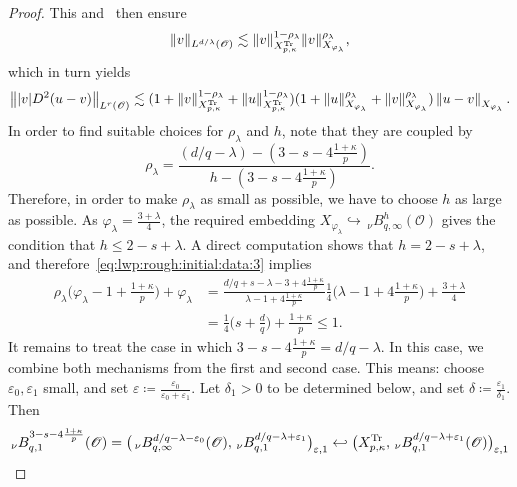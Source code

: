 \documentclass[reqno]{amsart}
\newcommand{\sO}{\mathscr{O}}
\newcommand{\ce}{\coloneqq}
\newcommand{\1}{\mathbf{1}}
\newcommand{\nrm}[1]{\left\lVert #1 \right\rVert}
\begin{document}
\begin{proof}
            This and~\cite[Theorem 1.3.3]{triebelInterpolationTheoryFunction1978} then ensure
            \begin{equation*}\| v\|_{L^{d/\lambda}(\sO)}\lesssim \|v\|_{X_{p,\kappa}^{\textup{Tr}}}^{1-\rho_\lambda} \|v\|_{X_{\varphi_\lambda}}^{\rho_\lambda},\end{equation*}
            which in turn yields
        	\[\nrm{|v|D^2(u-v)}_{L^r(\sO)} \lesssim (1+\nrm{v}_{X_{p,\kappa}^{\textup{Tr}}}^{1-\rho_\lambda}+\nrm{u}_{X_{p,\kappa}^{\textup{Tr}}}^{1-\rho_\lambda})(1+\nrm{u}_{X_{\varphi_\lambda}}^{\rho_\lambda}+\nrm{v}_{X_{\varphi_\lambda}}^{\rho_\lambda})\nrm{u-v}_{X_{\varphi_\lambda}}.\]
            In order to find suitable choices for $\rho_\lambda$ and $h$, note that they are coupled by 
            $$\rho_\lambda=\frac{(d/q-\lambda) -(3-s-4\frac{1+\kappa}{p})}{h-(3-s-4\frac{1+\kappa}{p})}.$$
            Therefore, in order to make $\rho_\lambda$ as small as possible, we have to choose $h$ as large as possible. As $\varphi_\lambda=\frac{3+\lambda}{4}$, the required embedding $X_{\varphi_\lambda}\hookrightarrow \,_\nu B_{q,\infty}^{h}(\sO)$ gives the condition that $h\le 2-s+\lambda$.
            A direct computation shows that $h=2-s+\lambda$, and therefore~\eqref{eq:lwp:rough:initial:data:3} implies
            \[
            \begin{aligned}
                \rho_\lambda\big( \varphi_\lambda-1+\frac{1+\kappa}{p}\big) +\varphi_\lambda&=\frac{d/q+s-\lambda-3+4\frac{1+\kappa}{p}}{\lambda-1+4\frac{1+\kappa}{p}}\frac{1}{4}\big(\lambda-1+4\frac{1+\kappa}{p}\big)+\frac{3+\lambda}{4}\\
                &=\frac{1}{4}\big(s+\frac{d}{q}\big) +\frac{1+\kappa}{p} \le 1.
            \end{aligned}
            \]
            It remains to treat the case in which  $3-s-4\frac{1+\kappa}{p}= d/q-\lambda$. 
            In this case, we combine both mechanisms from the first and second case. This means: choose $\varepsilon_0,\varepsilon_1$ small, and set $\varepsilon\ce \frac{\varepsilon_0}{\varepsilon_0+\varepsilon_1}$. Let $\delta_1>0$ to be determined below, and set $\delta\ce \frac{\varepsilon_1}{\delta_1}$. Then 
            \[\begin{aligned}
                _\nu B_{q,1}^{3-s-4\frac{1+\kappa}{p}}(\sO)&=\big(\,_\nu B^{d/q-\lambda-\varepsilon_0}_{q,\infty}(\sO), \,_\nu B_{q,1}^{d/q-\lambda+\varepsilon_1}\big)_{\varepsilon,1} \hookleftarrow \big(X_{p,\kappa}^{\textup{Tr}}, \,_\nu B_{q,1}^{d/q-\lambda+\varepsilon_1}(\sO)\big)_{\varepsilon,1}\\

\end{aligned}\]
\end{proof}
\end{document}
